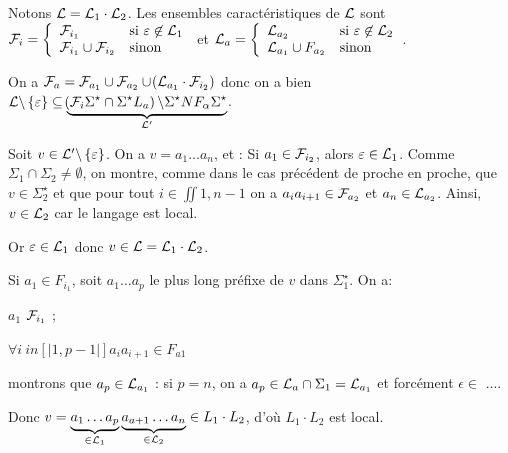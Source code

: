 \begin{nproof}
\begin{psse}
            \item Notons $\mathcal{L} = \mathcal{L}_1 \cdot \mathcal{L}_2$. Les ensembles caractéristiques de $\mathcal{L}$ sont $\mathcal{F}_i = \left\lbrace \begin{array}{ll}
                \mathcal{F}_{i_1} &\text{si} \ \varepsilon \not\in \mathcal{L}_1  \\
                \mathcal{F}_{i_1} \cup \mathcal{F}_{i_2} &\text{sinon} 
            \end{array}\right.$ et $\mathcal{L}_a = \left\lbrace \begin{array}{ll}
                \mathcal{L}_{a_2} &\text{si} \ \varepsilon \not\in \mathcal{L}_2  \\
                \mathcal{L}_{a_1} \cup F_{a_2} &\text{sinon} 
            \end{array}\right.$.
            
            On a $\mathcal{F}_a = \mathcal{F}_{a_1} \cup \mathcal{F}_{a_2} \cup \!\left(\mathcal{L}_{a_1} \cdot \mathcal{F}_{i_2}\right)$ donc on a bien $\mathcal{L} \backslash \left\{\varepsilon\right\} \subseteq \underbrace{\!\left(\mathcal{F}_i \Sigma^\star \cap \Sigma^\star L_a\right) \backslash \Sigma^\star NF_\alpha \Sigma^\star}_{\mathcal{L}'}$.
            
            Soit $v \in \mathcal{L}' \backslash \left\{\varepsilon\right\}$. On a $v = a_1 \dots a_n$, et :
            Si $a_1 \in \mathcal{F}_{i_2}$, alors $\varepsilon \in \mathcal{L}_1$. Comme $\Sigma_1 \cap \Sigma_2 \neq \emptyset$, on montre, comme dans le cas précédent de proche en proche, que $v \in \Sigma_2^\star$ et que pour tout $i \in \iint{1, n-1}$ on a $a_ia_{i+1} \in \mathcal{F}_{a_2}$ et $a_n \in \mathcal{L}_{a_2}$. Ainsi, $v \in \mathcal{L}_2$ car le langage est local.
            
            Or $\varepsilon \in \mathcal{L}_1$ donc $v \in \mathcal{L} = \mathcal{L}_1 \cdot \mathcal{L}_2$.
            
            Si $a_1 \in F_{i_1}$, soit $a_1 \dots a_p$ le plus long préfixe de $v$ dans $\Sigma_1^\star$. On a:
            \begin{enumerate}
                \itt $a_1$ \in $\mathcal{F}_{i_1}$ ;
                
                \itt $\forall i \ in [|1, p-1|] a_i a_{i+1} \in F_{a1} $%
                
                \itt montrons que $a_p \in \mathcal{L}_{a_1}$ : si $p = n$, on a $a_p \in \mathcal{L}_a \cap \Sigma_1 = \mathcal{L}_{a_1}$ et forcément $\epsilon \in $ ....

                Donc $v= \underbrace{a_1 \dots a_p}_{\in \mathcal{L}_1} \underbrace{a_{a+1} \dots a_n}_{\in \mathcal{L}_2} \in L_1 \cdot L_2$, d'où $L_1\cdot L_2$ est local.
                

\end{enumerate}
\end{psse}
\end{nproof}
